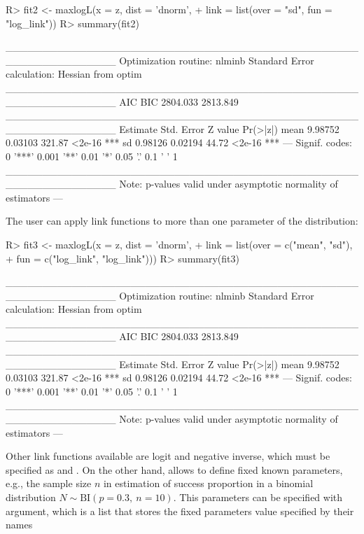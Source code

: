 \documentclass[nojss]{jss}
\begin{document}
\begin{Schunk}
\begin{Sinput}
R> fit2 <- maxlogL(x = z, dist = 'dnorm',
+                  link = list(over = "sd", fun = "log_link"))
R> summary(fit2)
\end{Sinput}
\begin{Soutput}
_______________________________________________________________
Optimization routine: nlminb 
Standard Error calculation: Hessian from optim 
_______________________________________________________________
       AIC      BIC
  2804.033 2813.849
_______________________________________________________________
     Estimate  Std. Error Z value Pr(>|z|)    
mean   9.98752    0.03103  321.87   <2e-16 ***
sd     0.98126    0.02194   44.72   <2e-16 ***
---
Signif. codes:  0 '***' 0.001 '**' 0.01 '*' 0.05 '.' 0.1 ' ' 1
_______________________________________________________________
Note: p-values valid under asymptotic normality of estimators 
---
\end{Soutput}
\end{Schunk}

The user can apply link functions to more than one parameter of the distribution:

\begin{Schunk}
\begin{Sinput}
R> fit3 <- maxlogL(x = z, dist = 'dnorm',
+                  link = list(over = c("mean", "sd"),
+                              fun = c("log_link", "log_link")))
R> summary(fit3)
\end{Sinput}
\begin{Soutput}
_______________________________________________________________
Optimization routine: nlminb 
Standard Error calculation: Hessian from optim 
_______________________________________________________________
       AIC      BIC
  2804.033 2813.849
_______________________________________________________________
     Estimate  Std. Error Z value Pr(>|z|)    
mean   9.98752    0.03103  321.87   <2e-16 ***
sd     0.98126    0.02194   44.72   <2e-16 ***
---
Signif. codes:  0 '***' 0.001 '**' 0.01 '*' 0.05 '.' 0.1 ' ' 1
_______________________________________________________________
Note: p-values valid under asymptotic normality of estimators 
---
\end{Soutput}
\end{Schunk}

Other link functions available are logit and negative inverse, which must be specified as  and . On the other hand,  allows to define fixed known parameters, e.g., the sample size $n$ in estimation of success proportion in a binomial distribution $N \sim \text{BI}(p=0.3, \: n=10)$. This parameters can be specified with  argument, which is a list that stores the fixed parameters value specified by their names
\end{document}
